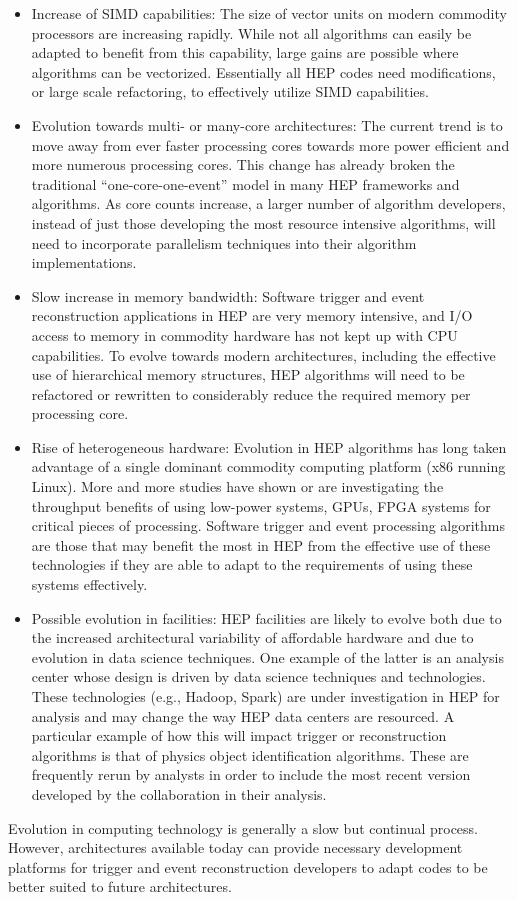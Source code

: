 \begin{itemize}
\item
Increase of SIMD capabilities: The size of vector units on modern commodity processors are increasing rapidly. While not all algorithms can easily be adapted to benefit from this capability, large gains are possible where algorithms can be vectorized. Essentially all HEP codes need modifications, or large scale refactoring, to effectively utilize SIMD capabilities.
\item
Evolution towards multi- or many-core architectures: The current trend is to move away from ever faster processing cores towards more power efficient and more numerous processing cores. This change has already broken the traditional “one-core-one-event” model in many HEP frameworks and algorithms. As core counts increase, a larger number of algorithm developers, instead of just those developing the most resource intensive algorithms, will need to incorporate parallelism techniques into their algorithm implementations.   
\item
Slow increase in memory bandwidth: Software trigger and event reconstruction applications in HEP are very memory intensive, and I/O access to memory in commodity hardware has not kept up with CPU capabilities. To evolve towards modern architectures, including the effective use of hierarchical memory structures, HEP algorithms will need to be refactored or rewritten to considerably reduce the required memory per processing core. 
\item
Rise of heterogeneous hardware: Evolution in HEP algorithms has long taken advantage of a single dominant commodity computing platform (x86 running Linux).  More and more studies have shown or are investigating the throughput benefits of using low-power systems, GPUs, FPGA systems for critical pieces of processing. Software trigger and event processing algorithms are those that may benefit the most in HEP from the effective use of these technologies if they are able to adapt to the requirements of using these systems effectively.
\item
Possible evolution in facilities: HEP facilities are likely to evolve both due to the increased architectural variability of affordable hardware and due to evolution in data science techniques. One example of the latter is an analysis center whose design is driven by data science techniques and technologies. These technologies (e.g., Hadoop, Spark) are under investigation in HEP for analysis and may change the way HEP data centers are resourced. A particular example of how this will impact trigger or reconstruction algorithms is that of physics object identification algorithms. These are frequently rerun by analysts in order to include the most recent version developed by the collaboration in their analysis.
\end{itemize}
Evolution in computing technology is generally a slow but continual process. However, architectures available today can provide necessary development platforms for trigger and event reconstruction developers to adapt codes to be better suited to future architectures.

